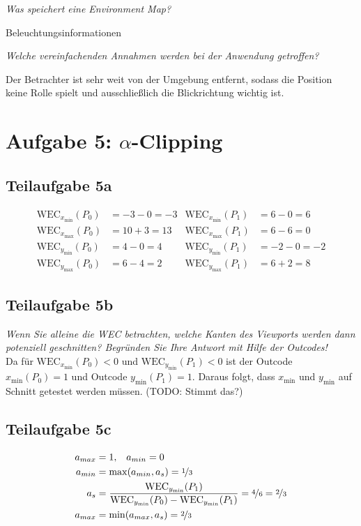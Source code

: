 \documentclass[a4paper]{scrartcl}
\begin{document}
\textit{Was speichert eine Environment Map?}

Beleuchtungsinformationen

\textit{Welche vereinfachenden Annahmen werden bei der Anwendung getroffen?}

Der Betrachter ist sehr weit von der Umgebung entfernt, sodass die Position
keine Rolle spielt und ausschließlich die Blickrichtung wichtig ist.


\section*{Aufgabe 5: $\alpha$-Clipping}
\subsection*{Teilaufgabe 5a}

\begin{align}
    \text{WEC}_{x_\text{min}}(P_0) &= -3-0 =-3 & \text{WEC}_{x_\text{min}}(P_1) &= 6-0 =6\\
    \text{WEC}_{x_\text{max}}(P_0) &= 10+3 =13 & \text{WEC}_{x_\text{max}}(P_1) &= 6-6 =0\\
    \text{WEC}_{y_\text{min}}(P_0) &= 4-0 = 4 & \text{WEC}_{y_\text{min}}(P_1) &= -2-0 =-2\\
    \text{WEC}_{y_\text{max}}(P_0) &= 6-4 = 2 & \text{WEC}_{y_\text{max}}(P_1) &= 6+2 =8
\end{align}

\goodbreak
\subsection*{Teilaufgabe 5b}
\textit{Wenn Sie alleine die WEC betrachten, welche Kanten des Viewports werden dann potenziell geschnitten? Begründen Sie Ihre Antwort mit Hilfe der Outcodes!}\\
Da für $\text{WEC}_{x_\text{min}}(P_0) < 0$ und $\text{WEC}_{y_\text{min}}(P_1) < 0$
ist der Outcode $x_\text{min}(P_0) = 1$ und Outcode $y_\text{min}(P_1) = 1$.
Daraus folgt, dass $x_\text{min}$ und $y_\text{min}$ auf Schnitt getestet
werden müssen. (TODO: Stimmt das?)

\subsection*{Teilaufgabe 5c}
\begin{align}
    a_{max} &= 1,\;\;\; a_{min} = 0\\
    a_{min} &= \max(a_{min}, a_s) = \nicefrac{1}{3}\\
    a_s &= \frac{\text{WEC}_{y_\text{min}}(P_1)}{\text{WEC}_{y_\text{min}}(P_0) - \text{WEC}_{y_\text{min}}(P_1)} = \nicefrac{4}{6} = \nicefrac{2}{3}\\
    a_{max} &= \min(a_{max}, a_s) = \nicefrac{2}{3}
\end{align}
\end{document}
